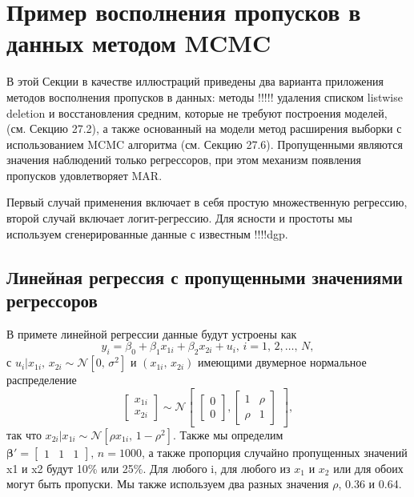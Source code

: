 \section{Пример восполнения пропусков в данных методом MCMC} 

В этой Секции в качестве иллюстраций приведены два варианта приложения методов восполнения пропусков в данных: методы !!!!! удаления списком listwise deletion и восстановления средним, которые не требуют построения моделей, (см. Секцию 27.2), а также основанный на модели метод расширения выборки с использованием MCMC алгоритма (см. Секцию 27.6). Пропущенными являются значения наблюдений только регрессоров, при этом механизм появления пропусков удовлетворяет MAR.

Первый случай применения включает в себя простую множественную регрессию, второй случай включает логит-регрессию. Для ясности и простоты мы используем сгенерированные данные с известным !!!!dgp.

\subsection{Линейная регрессия с пропущенными значениями регрессоров} 



В примете линейной регрессии данные будут устроены как
\begin{equation}
y_i=\beta_0+\beta_1 x_{1i}+\beta_2 x_{2i}+u_i, \, i=1, \, 2, \dots , \, N,
\end{equation}
с $u_i|x_{1i}, \, x_{2i} \sim \mathcal{N}[0, \, \sigma^2]$ и $(x_{1i}, \, x_{2i})$ имеющими двумерное нормальное распределение
\begin{equation}
\begin{bmatrix}
x_{1i} \\ x_{2i}
\end{bmatrix}
\sim \mathcal{N}
\begin{bmatrix}
\begin{bmatrix} 0 \\ 0 \end{bmatrix}, \begin{bmatrix} 1 & \rho \\ \rho & 1 \end{bmatrix}
\end{bmatrix},
\end{equation}
так что $x_{2i}|x_{1i} \sim \mathcal{N}[\rho x_{1i}, \, 1-\rho^2]$. Также мы определим $\mathbf{\beta'}=\begin{bmatrix} 1 & 1 & 1 \end{bmatrix}, \, n=1000$, а также пропорция случайно пропущенных значений x1 и x2 будут 10\% или 25\%. Для любого i, для любого из $x_1$ и $x_2$ или для обоих могут быть пропуски. Мы также используем два разных значения $\rho$, 0.36 и 0.64.

